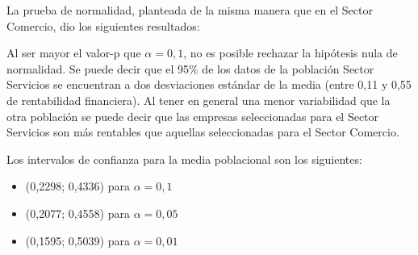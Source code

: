 \documentclass[12pt,a4paper,twoside]{article}
\begin{document}
La prueba de normalidad, planteada de la misma manera que en el Sector Comercio, dio los siguientes resultados:
\begin{figure}[H]
\end{figure}
Al ser mayor el valor-p que $\alpha= 0,1$, no es posible rechazar la hipótesis nula de normalidad. Se puede decir que el 95\% de los datos de la población Sector Servicios se encuentran a dos desviaciones estándar de la media (entre 0,11 y 0,55 de rentabilidad financiera). Al tener en general una menor variabilidad que la otra población se puede decir que las empresas seleccionadas para el Sector Servicios son más rentables que aquellas seleccionadas para el Sector Comercio. 

Los intervalos de confianza para la media poblacional son los siguientes:
\begin{itemize}
    \item (0,2298; 0,4336) para $\alpha=0,1$
    \item (0,2077; 0,4558) para $\alpha=0,05$
    \item (0,1595; 0,5039) para $\alpha=0,01$
\end{itemize}
\end{document}
